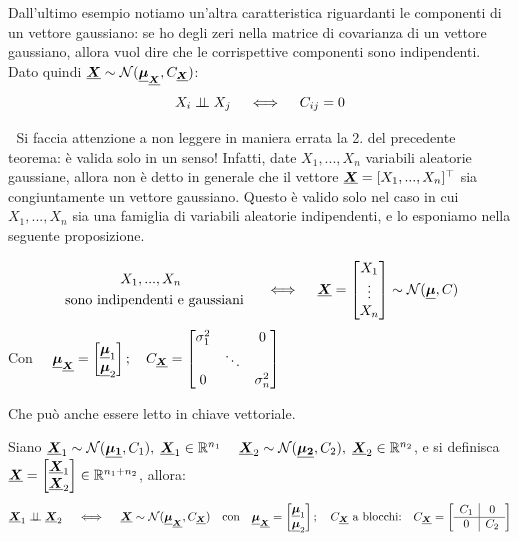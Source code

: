 Dall'ultimo esempio notiamo un'altra caratteristica riguardanti le componenti di un vettore gaussiano: se ho degli zeri nella matrice di covarianza di un vettore gaussiano, allora vuol dire che le corrispettive componenti sono indipendenti. Dato quindi $\underline{{\boldsymbol{X}}}\sim \mathcal{N}(\underline{{\boldsymbol{\mu}}}_{\underline{{\boldsymbol{X}}}}, C_{\underline{{\boldsymbol{X}}}})$:
\[X_i \mathrel{\perp\!\!\!\perp} X_j \quad \iff \quad C_{ij} = 0\]

\bigskip
\noindent \faWarning $\;$ Si faccia attenzione a non leggere in maniera errata la 2. del precedente teorema: è valida solo in un senso! Infatti, date $X_1, ..., X_n$ variabili aleatorie gaussiane, allora non è detto in generale che il vettore $\underline{{\boldsymbol{X}}} = [X_1, ..., X_n]^\top$ sia congiuntamente un vettore gaussiano. Questo è valido solo nel caso in cui $X_1, ..., X_n$ sia una famiglia di variabili aleatorie indipendenti, e lo esponiamo nella seguente proposizione.

\bigskip
\begin{proposizione}
\label{prop:13.6}
    \[\begin{aligned}
        &X_1, ..., X_n\\
        \text{ sono indi}&\text{pendenti e gaussiani }
    \end{aligned}\quad \iff \quad \underline{{\boldsymbol{X}}} = \begin{bmatrix} X_1\\\vdots\\X_n \end{bmatrix} \sim \mathcal{N}(\underline{{\boldsymbol{\mu}}}, C)\]
    Con $\quad \underline{{\boldsymbol{\mu}}}_{\underline{{\boldsymbol{X}}}} = \begin{bmatrix}\underline{{\boldsymbol{\mu}}}_1\\\underline{{\boldsymbol{\mu}}}_2\end{bmatrix};\quad C_{\underline{{\boldsymbol{X}}}} = \begin{bmatrix}\sigma_1^2 & & 0\\
     & \ddots & \\
     0 & & \sigma_n^2
    \end{bmatrix}$

    \bigskip
    \noindent Che può anche essere letto in chiave vettoriale.

    \medskip
    \noindent Siano $\underline{{\boldsymbol{X}}}_1\sim\mathcal{N}(\underline{{\boldsymbol{\mu_1}}}, C_1),\;\underline{{\boldsymbol{X}}}_1\in\mathbb{R}^{n_1}\;\quad \underline{{\boldsymbol{X}}}_2\sim\mathcal{N}(\underline{{\boldsymbol{\mu_2}}}, C_2),\;\underline{{\boldsymbol{X}}}_2\in\mathbb{R}^{n_2}$, e si definisca $\underline{{\boldsymbol{X}}} = \begin{bmatrix}\underline{{\boldsymbol{X}}}_1\\\underline{{\boldsymbol{X}}}_2\end{bmatrix} \in\mathbb{R}^{n_1+n_2}$, allora:
    \[\underline{{\boldsymbol{X}}}_1 \mathrel{\perp\!\!\!\perp} \underline{{\boldsymbol{X}}}_2\quad \iff \quad \underline{{\boldsymbol{X}}}\sim\mathcal{N}(\underline{{\boldsymbol{\mu}}}_{\underline{{\boldsymbol{X}}}}, C_{\underline{{\boldsymbol{X}}}})\quad \text{con}\quad \underline{{\boldsymbol{\mu}}}_{\underline{{\boldsymbol{X}}}} = \begin{bmatrix}\underline{{\boldsymbol{\mu}}}_1\\\underline{{\boldsymbol{\mu}}}_2\end{bmatrix};\quad \text{$C_{\underline{{\boldsymbol{X}}}}$ a blocchi:}\quad C_{\underline{{\boldsymbol{X}}}}=\left[\begin{array}{c|c}
C_1 & 0 \\
\hline
0 & C_2
\end{array}\right]
\]
\end{proposizione}

